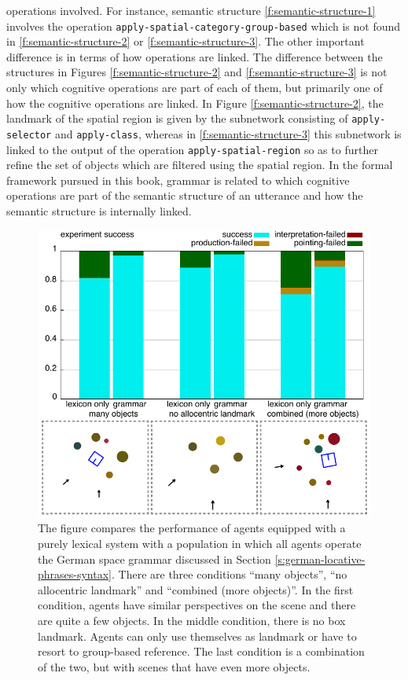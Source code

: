 operations involved. For instance, semantic structure \ref{f:semantic-structure-1}
involves the operation {\footnotesize\tt apply-spatial-category-group-based} 
which is not found in
\ref{f:semantic-structure-2} or \ref{f:semantic-structure-3}. The other 
important difference is in terms of how operations are linked. The 
difference between the structures in Figures \ref{f:semantic-structure-2}
and \ref{f:semantic-structure-3} is not only which cognitive operations 
are part of each of them, but primarily one of how the cognitive 
operations are linked. In Figure \ref{f:semantic-structure-2},
the landmark of the spatial region is given by the subnetwork consisting 
of {\footnotesize\tt apply-selector} and {\footnotesize\tt apply-class}, whereas in 
\ref{f:semantic-structure-3} this subnetwork is linked to the output of
the operation {\footnotesize\tt apply-spatial-region} so as to further refine the 
set of objects which are filtered using the spatial region. In the formal 
framework pursued in this book, grammar is related to which cognitive 
operations are part of the semantic structure of an 
utterance and how the semantic structure is internally linked.

\begin{figure}
\includegraphics[width=1.0\columnwidth]{figs/why-grammar-german}
\caption[German locative phrases with and without grammar]{%
The figure compares
the performance of agents equipped with a purely 
lexical system with a population in 
which all agents operate the German space 
grammar discussed in Section 
\ref{s:german-locative-phrases-syntax}.
There are three conditions ``many objects'', 
``no allocentric landmark'' and 
``combined (more objects)''. In the first 
condition, agents have similar perspectives on the scene 
and there are quite a few objects. In the middle condition, there 
is no box landmark. Agents can only use 
themselves as landmark or have to resort to group-based 
reference. The last condition is a combination
of the two, but with scenes that have even more objects.}
\label{f:why-grammar-german}
\end{figure}


